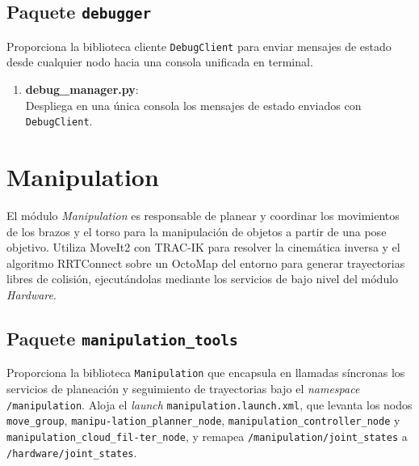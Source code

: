 \subsection{Paquete \texttt{debugger}}
Proporciona la biblioteca cliente \texttt{DebugClient} para enviar mensajes de estado desde cualquier nodo hacia una consola unificada en terminal.

\begin{enumerate}
    \item \textbf{debug\_manager.py}: \\
    Despliega en una única consola los mensajes de estado enviados con \texttt{DebugClient}.
\end{enumerate}


\section[Manipulation]{Manipulation}
\label{app:justina_manipulation}

El módulo \textit{Manipulation} es responsable de planear y coordinar los movimientos de los brazos y el torso para la manipulación de objetos a partir de una pose objetivo. Utiliza MoveIt2 con TRAC-IK para resolver la cinemática inversa y el algoritmo RRTConnect sobre un OctoMap del entorno para generar trayectorias libres de colisión, ejecutándolas mediante los servicios de bajo nivel del módulo \textit{Hardware}.

\subsection{Paquete \texttt{manipulation\_tools}}

Proporciona la biblioteca \texttt{Manipulation} que encapsula en llamadas síncronas los servicios de planeación y seguimiento de trayectorias bajo el \textit{namespace} \texttt{/manipulation}. Aloja el \textit{launch} \texttt{manipulation.launch.xml}, que levanta los nodos \texttt{move\_group}, \texttt{manipu-\allowbreak{}lation\_planner\_node}, \texttt{manipulation\_controller\_node} y \texttt{manipulation\_cloud\_fil-\allowbreak{}ter\_node}, y remapea \texttt{/manipulation/joint\_states} a \texttt{/hardware/joint\_states}.

